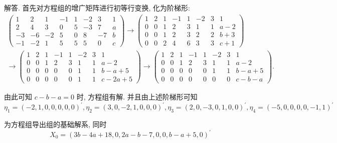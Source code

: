 \documentclass{article}
\begin{document}
解答. 首先对方程组的增广矩阵进行初等行变换, 化为阶梯形:
$$
    \begin{array}{l}
        \left(\begin{array}{cccccccc}
                1  & 2  & 1  & -1 & 1 & -2 & 3  & 1 \\
                2  & 4  & 3  & 0  & 5 & -3 & 7  & a \\
                -3 & -6 & -2 & 5  & 0 & 8  & -7 & b \\
                -1 & -2 & 1  & 5  & 5 & 5  & 0  & c
            \end{array}\right) \rightarrow\left(\begin{array}{cccccccc}
                1 & 2 & 1 & -1 & 1 & -2 & 3 & 1   \\
                0 & 0 & 1 & 2  & 3 & 1  & 1 & a-2 \\
                0 & 0 & 1 & 2  & 3 & 2  & 2 & b+3 \\
                0 & 0 & 2 & 4  & 6 & 3  & 3 & c+1
            \end{array}\right) \\
        \rightarrow\left(\begin{array}{cccccccc}
                1 & 2 & 1 & -1 & 1 & -2 & 3 & 1       \\
                0 & 0 & 1 & 2  & 3 & 1  & 1 & a-2     \\
                0 & 0 & 0 & 0  & 0 & 1  & 1 & b-a+5   \\
                0 & 0 & 0 & 0  & 0 & 1  & 1 & c-2 a+5
            \end{array}\right) \rightarrow\left(\begin{array}{cccccccc}
                1 & 2 & 1 & -1 & 1 & -2 & 3 & 1     \\
                0 & 0 & 1 & 2  & 3 & 1  & 1 & a-2   \\
                0 & 0 & 0 & 0  & 0 & 1  & 1 & b-a+5 \\
                0 & 0 & 0 & 0  & 0 & 0  & 0 & c-b-a
            \end{array}\right) .
    \end{array}
$$

由此可知 $c-b-a=0$ 时, 方程组有解. 并且由上述阶梯形可知
$$
    \eta_{1}=(-2,1,0,0,0,0,0)^{\prime}, \eta_{2}=(3,0,-2,1,0,0,0)^{\prime}, \eta_{3}=(2,0,-3,0,1,0,0)^{\prime}, \eta_{4}=(-5,0,0,0,0,-1,1)^{\prime}
$$

为方程组导出组的基础解系, 同时
$$
    X_{0}=(3 b-4 a+18,0,2 a-b-7,0,0, b-a+5,0)^{\prime}
$$
\end{document}
